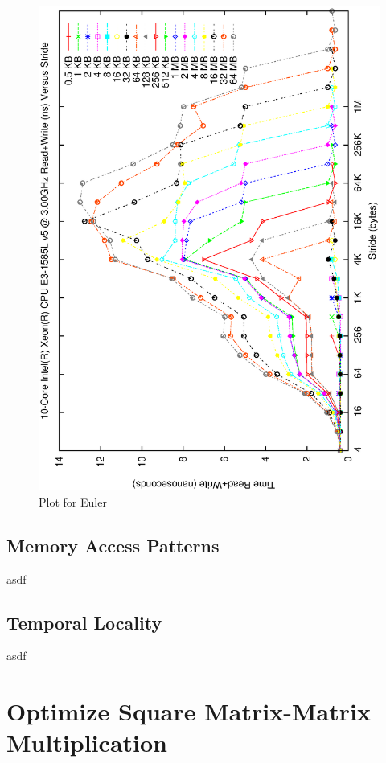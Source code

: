 \documentclass[unicode,11pt,a4paper,oneside,numbers=endperiod,openany]{scrartcl}
\begin{document}
\begin{figure}[h!]
    \centering
    \includegraphics{../membench/generic_euler.ps}
    \caption{Plot for Euler}
\end{figure}

\subsection{Memory Access Patterns}
asdf

\subsection{Temporal Locality}
asdf


\section{Optimize Square Matrix-Matrix Multiplication  }
\end{document}
